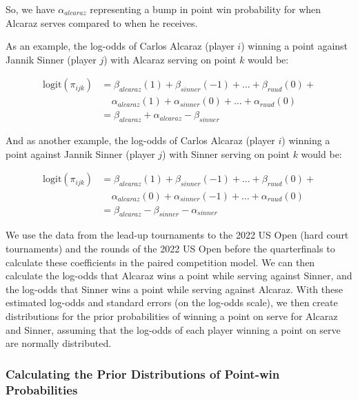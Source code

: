 \documentclass[
  letterpaper,
  DIV=11,
  numbers=noendperiod]{scrartcl}
\begin{document}
So, we have \(\alpha_{alcaraz}\) representing a bump in point win
probability for when Alcaraz serves compared to when he receives.

As an example, the log-odds of Carlos Alcaraz (player \(i\)) winning a
point against Jannik Sinner (player \(j\)) with Alcaraz serving on point
\(k\) would be:

\begin{equation}
  \begin{aligned}
    \text{logit}(\pi_{ijk}) & = \beta_{alcaraz}(1) +       \beta_{sinner}(-1) + \ldots + \beta_{ruud}(0) + \\
    & \;\;\;\; \alpha_{alcaraz}(1) + \alpha_{sinner}(0) + \ldots + \alpha_{ruud}(0) \\
    & = \beta_{alcaraz} + \alpha_{alcaraz} - \beta_{sinner}
  \end{aligned}
\end{equation}

And as another example, the log-odds of Carlos Alcaraz (player \(i\))
winning a point against Jannik Sinner (player \(j\)) with Sinner serving
on point \(k\) would be:

\begin{equation}
  \begin{aligned}
    \text{logit}(\pi_{ijk}) & = \beta_{alcaraz}(1) +       \beta_{sinner}(-1) + \ldots + \beta_{ruud}(0) + \\
    & \;\;\;\; \alpha_{alcaraz}(0) + \alpha_{sinner}(-1) + \ldots + \alpha_{ruud}(0) \\
    & = \beta_{alcaraz} - \beta_{sinner} - \alpha_{sinner}
  \end{aligned}
\end{equation}

We use the data from the lead-up tournaments to the 2022 US Open (hard
court tournaments) and the rounds of the 2022 US Open before the
quarterfinals to calculate these coefficients in the paired competition
model. We can then calculate the log-odds that Alcaraz wins a point
while serving against Sinner, and the log-odds that Sinner wins a point
while serving against Alcaraz. With these estimated log-odds and
standard errors (on the log-odds scale), we then create distributions
for the prior probabilities of winning a point on serve for Alcaraz and
Sinner, assuming that the log-odds of each player winning a point on
serve are normally distributed.

\subsubsection{Calculating the Prior Distributions of Point-win
Probabilities}\label{calculating-the-prior-distributions-of-point-win-probabilities}
\end{document}
